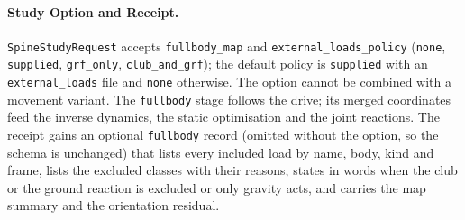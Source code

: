 \paragraph{Study Option and Receipt.}
\texttt{SpineStudyRequest} accepts \texttt{fullbody\_map} and
\texttt{external\_loads\_policy} (\texttt{none}, \texttt{supplied},
\texttt{grf\_only}, \texttt{club\_and\_grf}); the default policy is
\texttt{supplied} with an \texttt{external\_loads} file and \texttt{none}
otherwise. The option cannot be combined with a movement variant. The
\texttt{fullbody} stage follows the drive; its merged coordinates feed the inverse
dynamics, the static optimisation and the joint reactions. The receipt gains an
optional \texttt{fullbody} record (omitted without the option, so the schema is
unchanged) that lists every included load by name, body, kind and frame, lists the
excluded classes with their reasons, states in words when the club or the ground
reaction is excluded or only gravity acts, and carries the map summary and the
orientation residual.

